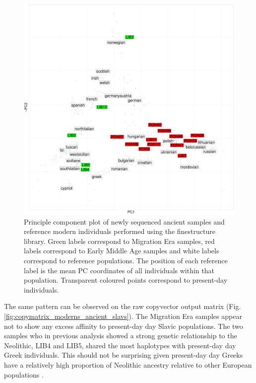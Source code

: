 \begin{figure}[htp]
    \centering
    \includegraphics[width=1.0\textwidth]{../images/chapter5/chunklengths_moderns_ancients_PCA.pdf}
    \caption{Principle component plot of newly sequenced ancient samples and reference modern individuals performed using the finestructure library. Green labels correspond to Migration Era samples, red labels correspond to Early Middle Age samples and white labels correspond to reference populations. The position of each reference label is the mean PC coordinates of all individuals within that population. Transparent coloured points correspond to present-day individuals.}
    \label{fig:chunklengths_moderns_ancients_PCA}
\end{figure}

The same pattern can be observed on the raw copyvector output matrix (Fig. \ref{fig:copymatrix_moderns_ancient_slavs}). The Migration Era samples appear not to show any excess affinity to present-day day Slavic populations. The two samples who in previous analysis showed a strong genetic relationship to the Neolithic, LIB4 and LIB5, shared the most haplotypes with present-day day Greek individuals. This should not be surprising given present-day day Greeks have a relatively high proportion of Neolithic ancestry relative to other European populations \cite{lazaridis2017genetic}. 

